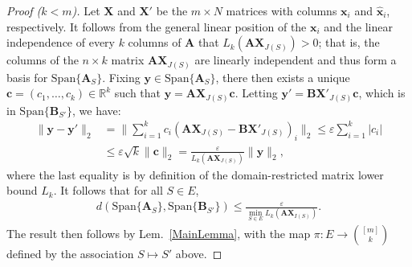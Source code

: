 \documentclass[9pt,twocolumn]{pnas-new}
\begin{document}
\begin{proof}[Proof ($k < m$)]
Let $\mathbf{X}$ and $\mathbf{X}'$ be the $m \times N$ matrices with columns $\mathbf{x}_i$ and $\mathbf{\hat x}_i$, respectively. It follows from the general linear position of the $\mathbf{x}_i$ and the linear independence of every $k$ columns of $\mathbf{A}$ that $L_k(\mathbf{AX}_{J(S)}) > 0$; that is, the columns of the $n \times k$ matrix $\mathbf{AX}_{J(S)}$ are linearly independent and thus form a basis for $\text{Span}\{\mathbf{A}_{S}\}$. Fixing $\mathbf{y} \in \text{Span}\{\mathbf{A}_{S}\}$, there then exists a unique $\mathbf{c} = (c_1, \ldots, c_k) \in \mathbb{R}^k$ such that $\mathbf{y} = \mathbf{AX}_{J(S)}\mathbf{c}$. Letting \mbox{$\mathbf{y'} = \mathbf{BX}'_{J(S)}\mathbf{c}$}, which is in $\text{Span}\{\mathbf{B}_{S'}\}$, we have:
\begin{align*}
\|\mathbf{y} - \mathbf{y'}\|_2 
&= \|\sum_{i=1}^k c_i(\mathbf{AX}_{J(S)} - \mathbf{BX}'_{J(S)})_i\|_2
\leq \varepsilon \sum_{i=1}^k |c_i| \\
&\leq \varepsilon \sqrt{k}  \|\mathbf{c}\|_2 
= \frac{\varepsilon}{L_k(\mathbf{AX}_{J(S)})} \|\mathbf{y}\|_2,
\end{align*}
where the last equality is by definition of the domain-restricted matrix lower bound $L_k$. It follows that for all $S \in E$,
\begin{align}\label{rhs222}
d(\text{Span}\{\mathbf{A}_S\}, \text{Span}\{\mathbf{B}_{S'}\}) 
\leq \frac{\varepsilon}{ \min_{S \in E} L_k(\mathbf{AX}_{I(S)}) }.
\end{align}
The result then follows by  Lem.~\ref{MainLemma}, with the map $\pi: E \to {[m] \choose k}$ defined by the association $S \mapsto S'$ above.
\end{proof}

 
\end{document}
